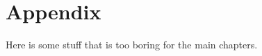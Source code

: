 \chapter{Appendix}
\label{app: Appendix}

Here is some stuff that is too boring for the main chapters.
